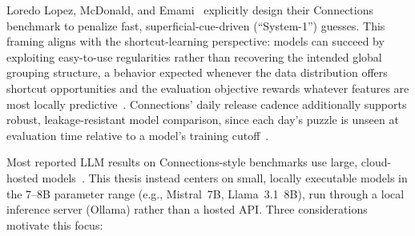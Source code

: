 Loredo Lopez, McDonald, and Emami~\cite{loredolopez2025} explicitly design
their Connections benchmark to penalize fast, superficial-cue-driven
(``System-1'') guesses. This framing aligns with the shortcut-learning
perspective: models can succeed by exploiting easy-to-use regularities
rather than recovering the intended global grouping structure, a behavior
expected whenever the data distribution offers shortcut opportunities and
the evaluation objective rewards whatever features are most locally
predictive~\cite{geirhos2020}. Connections' daily release cadence
additionally supports robust, leakage-resistant model comparison, since
each day's puzzle is unseen at evaluation time relative to a model's
training cutoff~\cite{loredolopez2025}.

\label{sec:small-models}


Most reported LLM results on Connections-style benchmarks use large,
cloud-hosted models~\cite{toddetal2024,loredolopez2025,zhangetal-connections}.
This thesis instead centers on small, locally executable models in the
7--8B parameter range (e.g., Mistral~7B, Llama~3.1~8B), run through a
local inference server (Ollama) rather than a hosted API. Three
considerations motivate this focus:

